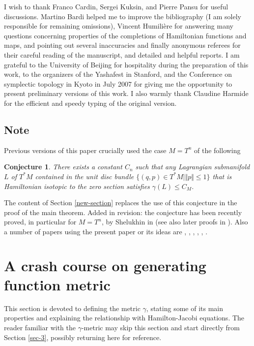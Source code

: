 \documentclass[JEP,XML,SOM,NoFloatCountersInSection,Unicode,published]{cedram}
\numberwithin{equation}{section}
\theoremstyle{plain}
\newtheorem{conjecture}{Conjecture}
\theoremstyle{definition}
\theoremstyle{remark}
\begin{document}
I wish to thank Franco Cardin, Sergei Kuksin, and Pierre Pansu for useful discussions. Martino Bardi helped me to improve the bibliography (I am solely responsible for remaining omissions), Vincent Humilière for answering many questions concerning properties of the completions of Hamiltonian functions and maps, and pointing out several inaccuracies and finally anonymous referees for their careful reading of the manuscript, and detailed and helpful reports. I am grateful to the University of Beijing for hospitality during the preparation of this work, to the organizers of the Yashafest in Stanford, and the Conference on symplectic topology in Kyoto in July 2007 for giving me the opportunity to present preliminary versions of this work. I also warmly thank Claudine Harmide for the efficient and speedy typing of the original version.

\subsection{Note}\label{Note}
Previous versions of this paper crucially used the case $M=T^n$ of the following
\begin{conjecture}\label{conjecture} There exists a constant $C_n$ such that any Lagrangian submanifold $L$ of $T^*M$ contained in the unit disc bundle $\{(q,p)\in T^*M \mid \Vert p \Vert \leq 1\}$ that is
Hamiltonian isotopic to the zero section satisfies $\gamma (L)\leq C_M$.
\end{conjecture}
The content of Section \ref{new-section} replaces the use of this conjecture in the proof of the main theorem.
Added in revision: the conjecture has been recently proved, in particular for $M=T^n$, by Shelukhin in \cite{Shelukhin} (see also later proofs in \cite{Guillermou-Vichery, Viterbo-support}). Also a number of papers using the present paper or its ideas
are \cite{M-V-Z}, \cite{M-Z}, \cite{Sorrentino-V}, \cite{NCMT}, \cite{Bisgaard}, \cite{Viterbo-stochastic}.

\section{A crash course on generating function metric}\label{Sec-gf-summary}
This section is devoted to defining the metric $\gamma$, stating some of its main properties and explaining the relationship with Hamilton-Jacobi equations. The reader familiar with the $\gamma$-metric may skip this section and start directly from Section \ref{sec-3}, possibly returning here for reference.
\end{document}
